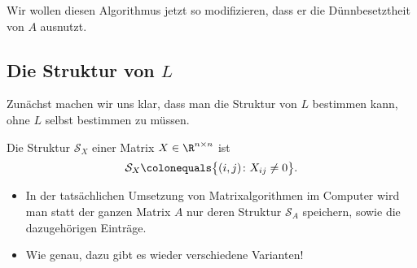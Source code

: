 Wir wollen diesen Algorithmus jetzt so modifizieren, dass er die Dünnbesetztheit von $A$
ausnutzt.

\subsection{Die Struktur von $L$}

Zunächst machen wir uns klar, dass man die Struktur von $L$ bestimmen kann,
ohne $L$ selbst bestimmen zu müssen.

\begin{defi}
 Die Struktur $\mathcal{S}_X$ einer Matrix $X \in \R^{n \times n}$ ist
 \begin{equation*}
  \mathcal{S}_X \colonequals \big\lbrace (i,j) \colon X_{ij} \neq 0 \big\rbrace.
\end{equation*}
\end{defi}
\begin{itemize}
 \item In der tatsächlichen Umsetzung von Matrixalgorithmen im Computer wird man statt der ganzen Matrix $A$ nur deren Struktur $\mathcal{S}_A$ speichern, sowie die dazugehörigen Einträge.
 \item Wie genau, dazu gibt es wieder verschiedene Varianten!
\end{itemize}


